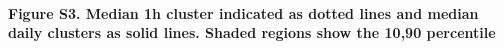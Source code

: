 \documentclass[11pt]{article}
\begin{document}
    \begin{center}
    \end{center}
    { \hspace*{\fill} \\}
    
    \textbf{Figure S3. Median 1h cluster indicated as dotted lines and
median daily clusters as solid lines. Shaded regions show the 10,90
percentile}


    
    
    
\end{document}
